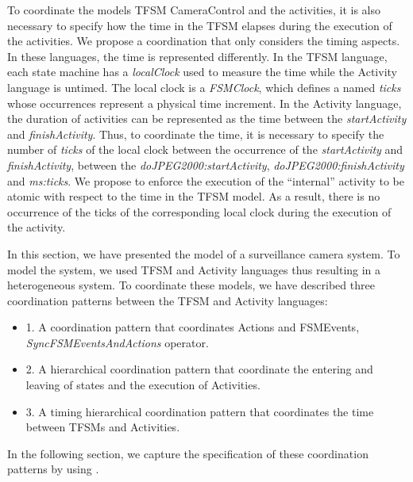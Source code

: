 To coordinate the models TFSM CameraControl and the activities, it is also necessary to specify how the time in the TFSM elapses during the execution of the activities. We propose a coordination that only considers the timing aspects. In these languages, the time is represented differently. In the TFSM language, each state machine has a \emph{localClock} used to measure the time while the Activity language is untimed. The local clock is a \emph{FSMClock}, which defines a \dse named \emph{ticks} whose occurrences represent a physical time increment. In the Activity language, the duration of activities can be represented as the time between the \dse \emph{startActivity} and \dse \emph{finishActivity}. Thus, to coordinate the time, it is necessary to specify the number of \emph{ticks} of the local clock between the occurrence of the \dse \emph{startActivity} and \emph{finishActivity}, \eg between the \mse \emph{doJPEG2000:startActivity}, \emph{doJPEG2000:finishActivity} and \emph{ms:ticks}.  We propose to enforce the execution of the ``internal'' activity to be atomic with respect to the time in the TFSM model. As a result, there is no occurrence of the \dse ticks of the corresponding local clock during the execution of the activity.  

In this section, we have presented the model of a surveillance camera system. To model the system, we used TFSM and Activity languages thus resulting in a heterogeneous system. To coordinate these models, we have described three coordination patterns between the TFSM and Activity languages:
	\begin{itemize}
		\item 1. A coordination pattern that coordinates Actions and FSMEvents, \ie \emph{SyncFSMEventsAndActions} operator. 
		\item 2. A hierarchical coordination pattern that coordinate the entering and leaving of states and the execution of Activities. 
		\item 3. A timing hierarchical coordination pattern that coordinates the time between TFSMs and Activities. 
	\end{itemize}
	
In the following section, we capture the specification of these coordination patterns by using \bcool.  

